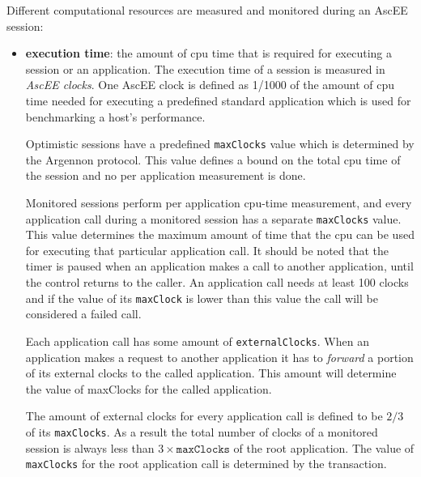 Different computational resources are measured and monitored during an AscEE session:
\begin{itemize}
    \item \textbf{execution time}:
    the amount of cpu time that is required for executing a session or an application. The execution time of a session
    is measured in \emph{AscEE clocks}. One AscEE clock is defined as 1/1000 of the amount
    of cpu time needed for executing a predefined standard application which is used for benchmarking a host's
    performance.

    Optimistic sessions have a predefined \texttt{maxClocks} value which is determined by the Argennon protocol. This
    value defines a bound on the total cpu time of the session and no per application measurement is done.

    Monitored sessions perform per application cpu-time measurement, and every application call during a monitored
    session has a separate \texttt{maxClocks} value. This value determines the maximum amount of time that the cpu
    can be used for executing that particular application call. It should be noted that the timer is paused when an
    application makes a call to another application, until the control returns to the caller. An application call
    needs at least 100 clocks and if the value of its \texttt{maxClock} is lower than this value the call will be
    considered a failed call.

    Each application call has some amount of \texttt{externalClocks}. When an application makes a request to another
    application it has to \emph{forward} a portion of its external clocks to the called application. This amount
    will determine the value of maxClocks for the called application.

    The amount of external clocks for every application
    call is defined to be \(2/3\) of its \texttt{maxClocks}. As a result the total number of clocks of a monitored
    session is always less than \(3 \times \texttt{maxClocks}\) of the root application. The value of
    \texttt{maxClocks} for
    the root application call is determined by the transaction.


\end{itemize}

